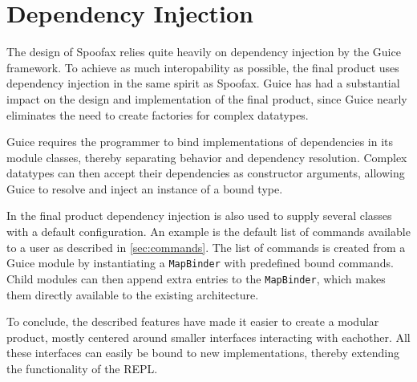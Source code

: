 \section{Dependency Injection}
\label{sec:injection}

The design of Spoofax relies quite heavily on dependency injection by the Guice
framework.  To achieve as much interopability as possible, the final product
uses dependency injection in the same spirit as Spoofax. Guice has had a
substantial impact on the design and implementation of the final product, since
Guice nearly eliminates the need to create factories for complex datatypes.

Guice requires the programmer to bind implementations of dependencies in its
module classes, thereby separating behavior and dependency resolution.  Complex
datatypes can then accept their dependencies as constructor arguments, allowing
Guice to resolve and inject an instance of a bound type.

In the final product dependency injection is also used to supply several classes
with a default configuration.  An example is the default list of commands
available to a user as described in \cref{sec:commands}.  The list of commands
is created from a Guice module by instantiating a \texttt{MapBinder} with
predefined bound commands. Child modules can then append extra entries to the
\texttt{MapBinder}, which makes them directly available to the existing
architecture.

To conclude, the described features have made it easier to create a modular
product, mostly centered around smaller interfaces interacting with eachother.
All these interfaces can easily be bound to new implementations, thereby
extending the functionality of the REPL.
